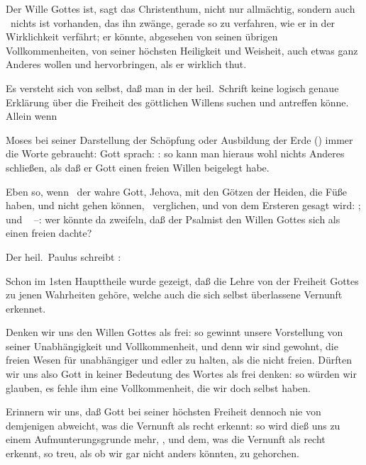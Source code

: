 
Der Wille Gottes ist, sagt das Christenthum, nicht nur allmächtig, sondern auch  \dh\ nichts ist vorhanden, das ihn zwänge, gerade so zu verfahren, wie er in der Wirklichkeit verfährt; er könnte, abgesehen von seinen übrigen Vollkommenheiten, von seiner höchsten Heiligkeit und Weisheit, auch etwas ganz Anderes wollen und hervorbringen, als er wirklich thut.

Es versteht sich von selbst, daß man in der heil.\ Schrift keine logisch genaue Erklärung über die Freiheit des göttlichen Willens suchen und antreffen könne. Allein wenn
\begin{aufza}
\item Moses bei seiner Darstellung der Schöpfung oder Ausbildung der Erde () immer die Worte gebraucht: Gott sprach: : so kann man hieraus wohl nichts Anderes schließen, als daß er Gott einen freien Willen beigelegt habe.
\item Eben so, wenn \ der wahre Gott, Jehova, mit den Götzen der Heiden, die Füße haben, und nicht gehen können, \usw\ verglichen, und von dem Ersteren gesagt wird: ; und \  --: wer könnte da zweifeln, daß der Psalmist den Willen Gottes sich als einen freien dachte?
\item Der heil.\ Paulus schreibt : 
\end{aufza}

Schon im 1sten Haupttheile wurde gezeigt, daß die Lehre von der Freiheit Gottes zu jenen Wahrheiten gehöre, welche auch die sich selbst überlassene Vernunft erkennet.

\begin{aufza}
\item Denken wir uns den Willen Gottes als frei: so gewinnt unsere Vorstellung von seiner Unabhängigkeit und Vollkommenheit, und  denn wir sind gewohnt, die freien Wesen für unabhängiger und edler zu halten, als die nicht freien. Dürften wir uns also Gott in keiner Bedeutung des Wortes als frei denken: so würden wir glauben, es fehle ihm eine Vollkommenheit, die wir doch selbst haben.
\item Erinnern wir uns, daß Gott bei seiner höchsten Freiheit dennoch nie von demjenigen abweicht, was die Vernunft als recht erkennt: so wird dieß uns zu einem Aufmunterungsgrunde mehr, , und dem, was die Vernunft als recht erkennt, so treu, als ob wir gar nicht anders könnten, zu gehorchen.
\end{aufza}

